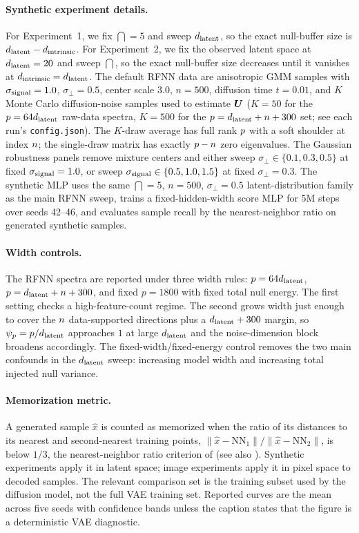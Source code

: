 \paragraph{Synthetic experiment details.}
For Experiment~1, we fix $\dint=5$ and sweep $d_{\mathrm{latent}}$, so the exact null-buffer
size is $d_{\mathrm{latent}}-d_{\mathrm{intrinsic}}$. For Experiment~2, we fix the observed latent space at
$d_{\mathrm{latent}}=20$ and sweep $\dint$, so the exact null-buffer size decreases until it
vanishes at $d_{\mathrm{intrinsic}}=d_{\mathrm{latent}}$. The default RFNN data are anisotropic GMM samples
with $\sigma_{\rm signal}=1.0$, $\sigma_\perp=0.5$, center scale $3.0$,
$n=500$, diffusion time $t=0.01$, and $K$ Monte Carlo diffusion-noise samples used to estimate $\bm{U}$ ($K=50$ for the $p=64d_{\mathrm{latent}}$ raw-data spectra, $K=500$ for the $p=d_{\mathrm{latent}}+n+300$ set; see each run's \texttt{config.json}). The $K$-draw average has full rank $p$ with a soft shoulder at index $n$; the single-draw matrix has exactly $p-n$ zero eigenvalues. The Gaussian robustness panels remove mixture centers
and either sweep $\sigma_\perp\in\{0.1,0.3,0.5\}$ at fixed
$\sigma_{\rm signal}=1.0$, or sweep
$\sigma_{\rm signal}\in\{0.5,1.0,1.5\}$ at fixed $\sigma_\perp=0.3$.
The synthetic MLP uses the same $\dint=5$, $n=500$, $\sigma_\perp=0.5$
latent-distribution family as the main RFNN sweep, trains a fixed-hidden-width
score MLP for 5M steps over seeds 42--46, and evaluates sample recall by the
nearest-neighbor ratio on generated synthetic samples.

\paragraph{Width controls.}
\label{app:width-controls}
The RFNN spectra are reported under three width rules:
$p=64d_{\mathrm{latent}}$, $p=d_{\mathrm{latent}}+n+300$, and fixed $p=1800$ with fixed total null energy.
The first setting checks a high-feature-count regime. The second grows width just enough to cover the $n$ data-supported directions plus a $d_{\mathrm{latent}}+300$ margin, so $\psi_p=p/d_{\mathrm{latent}}$ approaches $1$ at large $d_{\mathrm{latent}}$ and the noise-dimension block broadens accordingly. The
fixed-width/fixed-energy control removes the two main confounds in the $d_{\mathrm{latent}}$
sweep: increasing model width and increasing total injected null variance.

\paragraph{Memorization metric.}
A generated sample $\hat x$ is counted as memorized when the ratio of its distances to its nearest and second-nearest training points, $\|\hat x-\mathrm{NN}_1\|/\|\hat x-\mathrm{NN}_2\|$, is below $1/3$, the nearest-neighbor ratio criterion of \citet{bonnaire2025} (see also \citealp{somepalli2023diffusion}). Synthetic experiments apply it in latent space; image experiments apply it in pixel space to decoded samples. The relevant comparison set is the training subset used
by the diffusion model, not the full VAE training set. Reported curves are the
mean across five seeds with confidence bands unless the caption states that the
figure is a deterministic VAE diagnostic.

